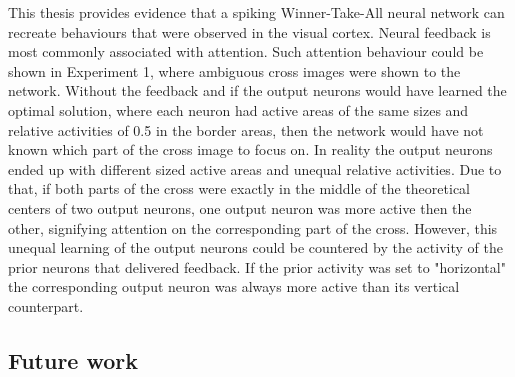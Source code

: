 This thesis provides evidence that a spiking Winner-Take-All neural network can recreate behaviours that were observed in the visual cortex. Neural feedback is most commonly associated with attention. Such attention behaviour could be shown in Experiment 1, where ambiguous cross images were shown to the network. Without the feedback and if the output neurons would have learned the optimal solution, where each neuron had active areas of the same sizes and relative activities of 0.5 in the border areas, then the network would have not known which part of the cross image to focus on. In reality the output neurons ended up with different sized active areas and unequal relative activities. Due to that, if both parts of the cross were exactly in the middle of the theoretical centers of two output neurons, one output neuron was more active then the other, signifying attention on the corresponding part of the cross. However, this unequal learning of the output neurons could be countered by the activity of the prior neurons that delivered feedback. If the prior activity was set to "horizontal" the corresponding output neuron was always more active than its vertical counterpart.







\subsection{Future work}


